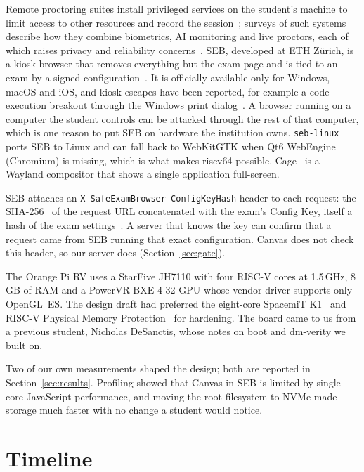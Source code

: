 \documentclass[11pt]{article}
\begin{document}
Remote proctoring suites install privileged services on the student's machine to limit access to other resources and record the session~\cite{burgess2022}; surveys of such systems describe how they combine biometrics, AI monitoring and live proctors, each of which raises privacy and reliability concerns~\cite{slusky2020}. SEB, developed at ETH Z\"urich, is a kiosk browser that removes everything but the exam page and is tied to an exam by a signed configuration~\cite{giustolisi2015,seb_concept}. It is officially available only for Windows, macOS and iOS, and kiosk escapes have been reported, for example a code-execution breakout through the Windows print dialog~\cite{cve2022_36220}. A browser running on a computer the student controls can be attacked through the rest of that computer, which is one reason to put SEB on hardware the institution owns. \texttt{seb-linux}~\cite{seblinux} ports SEB to Linux and can fall back to WebKitGTK when Qt6 WebEngine (Chromium) is missing, which is what makes riscv64 possible. Cage~\cite{cage_kiosk} is a Wayland compositor that shows a single application full-screen.

SEB attaches an \texttt{X-SafeExamBrowser-ConfigKeyHash} header to each request: the SHA-256~\cite{fips180} of the request URL concatenated with the exam's Config Key, itself a hash of the exam settings~\cite{seb_concept}. A server that knows the key can confirm that a request came from SEB running that exact configuration. Canvas does not check this header, so our server does (Section~\ref{sec:gate}).

The Orange Pi RV uses a StarFive JH7110 with four RISC-V cores at 1.5\,GHz, 8\,GB of RAM and a PowerVR BXE-4-32 GPU whose vendor driver supports only OpenGL~ES. The design draft had preferred the eight-core SpacemiT K1~\cite{spacemit_k1} and RISC-V Physical Memory Protection~\cite{riscv_priv} for hardening. The board came to us from a previous student, Nicholas DeSanctis, whose notes on boot and dm-verity we built on.

Two of our own measurements shaped the design; both are reported in Section~\ref{sec:results}. Profiling showed that Canvas in SEB is limited by single-core JavaScript performance, and moving the root filesystem to NVMe made storage much faster with no change a student would notice.

\section{Timeline}
\end{document}
